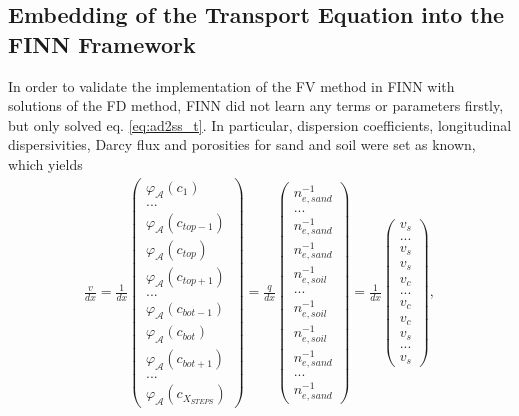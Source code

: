 \subsection{Embedding of the Transport Equation into the FINN Framework}
In order to validate the implementation of the FV method in FINN with solutions of the FD method, FINN did not learn any terms or parameters firstly, but only solved eq. \ref{eq:ad2ss_t}. In particular, dispersion coefficients, longitudinal dispersivities, Darcy flux and porosities for sand and soil were set as known, which yields
\begin{align}
    \frac{v}{dx} = \frac{1}{dx} \left(\begin{matrix}  \varphi_{\mathcal{A}}(c_1)\\ ...\\\varphi_{\mathcal{A}}(c_{top-1})\\\varphi_{\mathcal{A}}(c_{top})\\\varphi_{\mathcal{A}}(c_{top+1})\\...\\\varphi_{\mathcal{A}}(c_{bot-1})\\\varphi_{\mathcal{A}}(c_{bot})\\\varphi_{\mathcal{A}}(c_{bot+1})\\
    ...\\ \varphi_{\mathcal{A}}(c_{X_{STEPS}})\end{matrix}\right) = \frac{q}{dx} \left(\begin{matrix}  n_{e, sand}^{-1}\\ ...\\n_{e, sand}^{-1}\\n_{e, sand}^{-1}\\n_{e, soil}^{-1}\\...\\n_{e, soil}^{-1}\\n_{e, soil}^{-1}\\n_{e, sand}^{-1}\\
    ...\\n_{e, sand}^{-1} \end{matrix}\right) = \frac{1}{dx} \left(\begin{matrix}  v_s\\ ...\\v_s\\v_s\\v_c\\...\\v_c\\v_c\\v_s\\
    ...\\v_s\end{matrix}\right),
\end{align}
